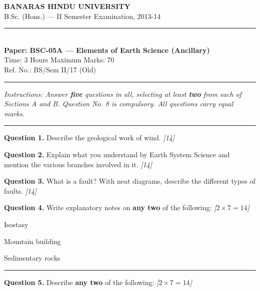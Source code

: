 \documentclass[11pt,a4paper]{article}
\newcommand{\pts}[1]{\hfill   \textit{[#1]}}
\begin{document}
\begin{center}
  {\large\bfseries BANARAS HINDU UNIVERSITY}\\[2pt]
  {\normalsize B.Sc. (Hons.) --- II Semester Examination, 2013-14}\\[6pt]
  \rule{0.8\linewidth}{0.5pt}\\[6pt]
  {\large\bfseries Paper: BSC-05A --- Elements of Earth Science (Ancillary)}\\[4pt]
  {\normalsize Time: 3 Hours \hfill Maximum Marks: 70}\\[2pt]
  {\small Ref. No.: BS/Sem II/17 (Old)}
\end{center}
\rule{\linewidth}{0.4pt}
\smallskip



\noindent   \textit{Instructions: Answer   \textbf{five} questions in all, selecting at least   \textbf{two} from each of Sections A and B. Question No. 8 is compulsory. All questions carry equal marks.}
\bigskip

\bigskip


\rule{\linewidth}{0.4pt}\smallskip




\noindent   \textbf{Question 1.} Describe the geological work of wind. \pts{14}

\medskip


\noindent   \textbf{Question 2.} Explain what you understand by Earth System Science and mention the various branches involved in it. \pts{14}

\medskip


\noindent   \textbf{Question 3.} What is a fault? With neat diagrams, describe the different types of faults. \pts{14}

\medskip


\noindent   \textbf{Question 4.} Write explanatory notes on   \textbf{any two} of the following: \pts{$2  \times 7 = 14$}

\begin{parts}
  \item Isostasy
  \item Mountain building
  \item Sedimentary rocks
\end{parts}

\bigskip


\rule{\linewidth}{0.4pt}\smallskip




\noindent   \textbf{Question 5.} Describe   \textbf{any two} of the following: \pts{$2  \times 7 = 14$}
\end{document}
